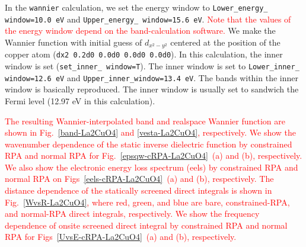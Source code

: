 \documentclass{article}
\newcommand{\tr}[1]{\textcolor{red}{#1}}
\begin{document}
In the \verb+wannier+ calculation, we set the energy window to \verb+Lower_energy_ window=10.0 eV+ and \verb+Upper_energy_ window=15.6 eV+. \tr{Note that the values of the energy window depend on the band-calculation software.} We make the Wannier function with initial guess of $d_{x^2-y^2}$ centered at the position of the copper atom (\verb+dx2 0.2d0 0.0d0 0.0d0 0.0d0+). In this calculation, the inner window is set (\verb+set_inner_ window=T+). The inner window is set to \verb+Lower_inner_ window=12.6 eV+ and \verb+Upper_inner_window=13.4 eV+. The bands within the inner window is basically reproduced. The inner window is usually set to sandwich the Fermi level (12.97 eV in this calculation).

\tr{The resulting Wannier-interpolated band and realspace Wannier function are shown in Fig.~\ref{band-La2CuO4} and \ref{vesta-La2CuO4}, respectively. We show the wavenumber dependence of the static inverse dielectric function by constrained RPA and normal RPA for Fig.~\ref{epsqw-cRPA-La2CuO4}~(a) and (b), respectively. We also show the electronic energy loss spectrum (eels) by constrained RPA and normal RPA on Figs~\ref{eels-cRPA-La2CuO4}~(a) and (b), respectively. The distance dependence of the statically screened direct integrals is shown in Fig.~\ref{WvsR-La2CuO4}, where red, green, and blue are bare, constrained-RPA, and normal-RPA direct integrals, respectively. We show the frequency dependence of onsite screened direct integral by constrained RPA and normal RPA for Figs~\ref{UvsE-cRPA-La2CuO4}~(a) and (b), respectively.} 
\end{document}
